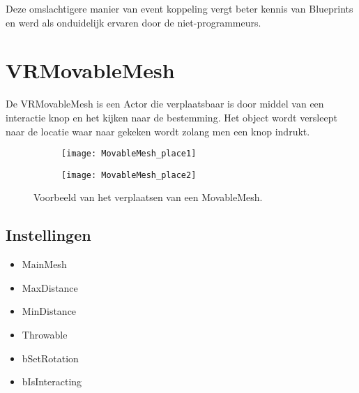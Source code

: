 Deze omslachtigere manier van event koppeling vergt beter kennis van Blueprints en werd als onduidelijk ervaren door de niet-programmeurs.

\section{VRMovableMesh}
De VRMovableMesh is een Actor die verplaatsbaar is door middel van een interactie knop en het kijken naar de bestemming. Het object wordt versleept naar de locatie waar naar gekeken wordt zolang men een knop indrukt.

\begin{figure}[!ht]
  \centering
  	\begin{subfigure}[b]{\linewidth/3}
    	\texttt{[image: MovableMesh\_place1]}
    	\label{fig:a}
	\end{subfigure}

	\begin{subfigure}[b]{\linewidth/3}
    	\texttt{[image: MovableMesh\_place2]}
    	\label{fig:b}
	\end{subfigure}

	\caption{Voorbeeld van het verplaatsen van een MovableMesh.}
\end{figure}

\subsection{Instellingen}

\begin{itemize}
	\item MainMesh
	\item MaxDistance
	\item MinDistance
	\item Throwable
	\item bSetRotation
	\item bIsInteracting
\end{itemize}